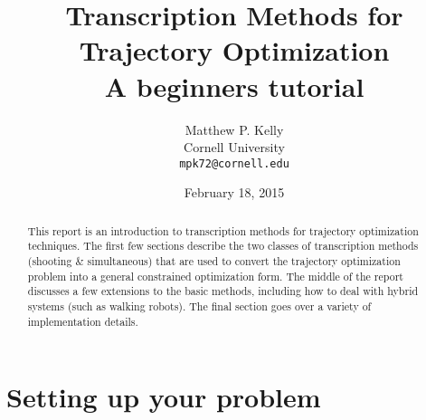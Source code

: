 \documentclass[onecolumn]{article}
\begin{document}



\setlength{\droptitle}{-60pt}  %
\title{Transcription Methods for Trajectory Optimization \\
\vspace{4pt}
\Large{ A beginners tutorial}}
\author{Matthew P. Kelly\\
	Cornell University\\
	\texttt{mpk72@cornell.edu}}
\date{February 18, 2015}  %
\maketitle



\begin{abstract}

This report is an introduction to transcription methods for trajectory optimization techniques. The first few sections describe the two classes of transcription methods (shooting \& simultaneous) that are used to convert the trajectory optimization problem into a general constrained optimization form. The middle of the report discusses a few extensions to the basic methods, including how to deal with hybrid systems (such as walking robots). The final section goes over a variety of implementation details.

\end{abstract}







\section{Setting up your problem}















\end{document}
